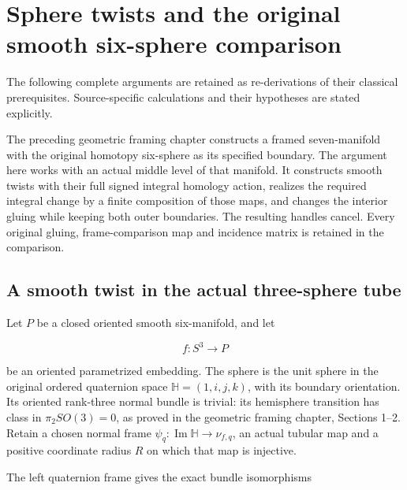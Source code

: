 \section{Sphere twists and the original smooth six-sphere comparison}\label{courseIII:sphere-twists-and-the-original-smooth-six-sphere-comparison:section}

The following complete arguments are retained as re-derivations of their classical prerequisites. Source-specific calculations and their hypotheses are stated explicitly.

The preceding geometric framing chapter constructs a framed seven-manifold with the original homotopy six-sphere as its specified boundary. The argument here works with an actual middle level of that manifold. It constructs smooth twists with their full signed integral homology action, realizes the required integral change by a finite composition of those maps, and changes the interior gluing while keeping both outer boundaries. The resulting handles cancel. Every original gluing, frame-comparison map and incidence matrix is retained in the comparison.

\subsection{A smooth twist in the actual three-sphere tube}
\label{courseIII:sphere-twists-and-the-original-smooth-six-sphere-comparison:twist-actual-tube}

\label{courseIII:sphere-twists-and-the-original-smooth-six-sphere-comparison:section-1}

Let \(P\) be a closed oriented smooth six-manifold, and let

\begin{equation}
f:S^3\longrightarrow P
 \label{courseIII:sphere-twists-and-the-original-smooth-six-sphere-comparison:eq:1.1}
\end{equation}

be an oriented parametrized embedding. The sphere is the unit sphere in the original ordered quaternion space \(\mathbb H=(1,i,j,k)\), with its boundary orientation. Its oriented rank-three normal bundle is trivial: its hemisphere transition has class in \(\pi_2SO(3)=0\), as proved in the geometric framing chapter, Sections 1--2. Retain a chosen normal frame \(\psi_q:\operatorname{Im}\mathbb H\to\nu_{f,q}\), an actual tubular map and a positive coordinate radius \(R\) on which that map is injective.

The left quaternion frame gives the exact bundle isomorphisms

